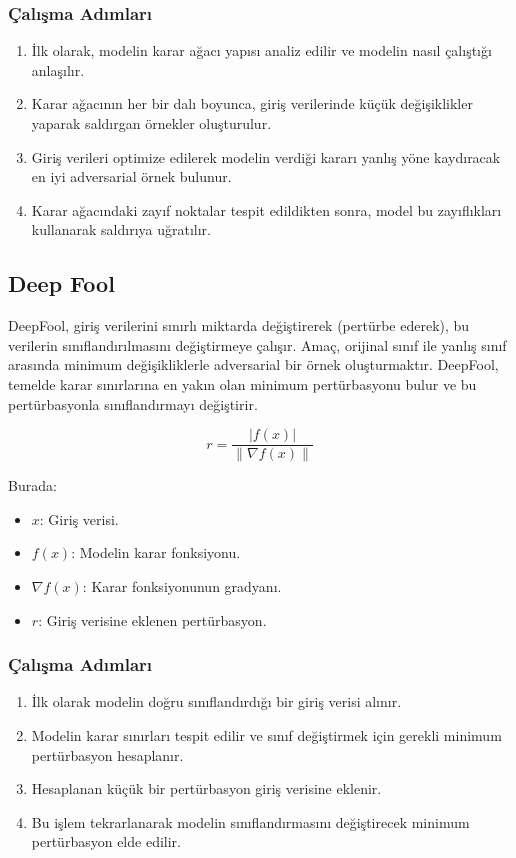 \subsubsection{Çalışma Adımları}

\begin{enumerate}
    \item İlk olarak, modelin karar ağacı yapısı analiz edilir ve modelin nasıl çalıştığı anlaşılır.
    \item Karar ağacının her bir dalı boyunca, giriş verilerinde küçük değişiklikler yaparak saldırgan örnekler oluşturulur.
    \item Giriş verileri optimize edilerek modelin verdiği kararı yanlış yöne kaydıracak en iyi adversarial örnek bulunur.
    \item Karar ağacındaki zayıf noktalar tespit edildikten sonra, model bu zayıflıkları kullanarak saldırıya uğratılır.
\end{enumerate}

\newpage

\subsection{Deep Fool}

DeepFool, giriş verilerini sınırlı miktarda değiştirerek (pertürbe ederek), bu verilerin sınıflandırılmasını değiştirmeye çalışır. Amaç, orijinal sınıf ile yanlış sınıf arasında minimum değişikliklerle adversarial bir örnek oluşturmaktır. DeepFool, temelde karar sınırlarına en yakın olan minimum pertürbasyonu bulur ve bu pertürbasyonla sınıflandırmayı değiştirir.

\[ r = \frac{| f(x) |}{\|\nabla f(x)\|} \]

Burada:

\begin{itemize}
    \item $x$: Giriş verisi.
    \item $f(x)$: Modelin karar fonksiyonu.
    \item $\nabla f(x)$: Karar fonksiyonunun gradyanı.
    \item $r$: Giriş verisine eklenen pertürbasyon.
\end{itemize}

\subsubsection{Çalışma Adımları}

\begin{enumerate}
    \item İlk olarak modelin doğru sınıflandırdığı bir giriş verisi alınır.
    \item Modelin karar sınırları tespit edilir ve sınıf değiştirmek için gerekli minimum pertürbasyon hesaplanır.
    \item Hesaplanan küçük bir pertürbasyon giriş verisine eklenir.
    \item Bu işlem tekrarlanarak modelin sınıflandırmasını değiştirecek minimum pertürbasyon elde edilir.
\end{enumerate}

